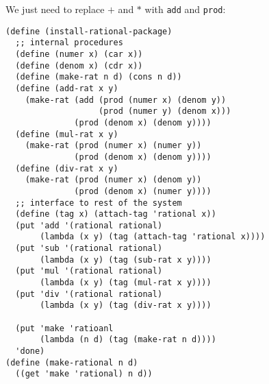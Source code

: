 \documentclass[a4paper,12pt]{article}
\begin{document}
We just need to replace $+$ and $*$ with \lstinline!add! and
\lstinline!prod!: 
\begin{lstlisting}
(define (install-rational-package)
  ;; internal procedures
  (define (numer x) (car x))
  (define (denom x) (cdr x))
  (define (make-rat n d) (cons n d))
  (define (add-rat x y)
    (make-rat (add (prod (numer x) (denom y))
                   (prod (numer y) (denom x)))
              (prod (denom x) (denom y))))
  (define (mul-rat x y)
    (make-rat (prod (numer x) (numer y))
              (prod (denom x) (denom y))))
  (define (div-rat x y)
    (make-rat (prod (numer x) (denom y))
              (prod (denom x) (numer y))))
  ;; interface to rest of the system
  (define (tag x) (attach-tag 'rational x))
  (put 'add '(rational rational)
       (lambda (x y) (tag (attach-tag 'rational x))))
  (put 'sub '(rational rational)
       (lambda (x y) (tag (sub-rat x y))))
  (put 'mul '(rational rational)
       (lambda (x y) (tag (mul-rat x y))))
  (put 'div '(rational rational)
       (lambda (x y) (tag (div-rat x y))))

  (put 'make 'ratioanl
       (lambda (n d) (tag (make-rat n d))))
  'done)
(define (make-rational n d)
  ((get 'make 'rational) n d))
\end{lstlisting}
\end{document}
